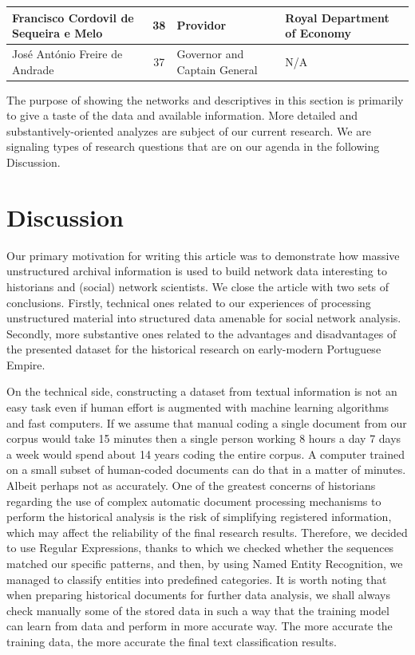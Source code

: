 \documentclass{article}
\begin{document}
\begin{table}[]
\begin{tabular}{|p{4cm}|c|p{4cm}|p{4cm}|}
		Francisco Cordovil de Sequeira e Melo                                        & 38                             & \multicolumn{1}{l|}{Providor}                     & Royal Department of Economy                    \\ \hline
		José António Freire de Andrade                                               & 37                             & \multicolumn{1}{l|}{Governor and Captain General} & N/A                                            \\ \hline
	\end{tabular}
\end{table}

The purpose of showing the networks and descriptives in this section is primarily to give a taste of the data and available information. More detailed and substantively-oriented analyzes are subject of our current research. We are signaling types of research questions that are on our agenda in the following Discussion.

\section{Discussion}

Our primary motivation for writing this article was to demonstrate how massive unstructured archival information is used to build network data interesting to historians and (social) network scientists. We close the article with two sets of conclusions. Firstly, technical ones related to our experiences of processing unstructured material into structured data amenable for social network analysis. Secondly, more substantive ones related to the advantages and disadvantages of the presented dataset for the historical research on early-modern Portuguese Empire.

On the technical side, constructing a dataset from textual information is not an easy task even if human effort is augmented with machine learning algorithms and fast computers. If we assume that manual coding a single document from our corpus would take 15 minutes then a single person working 8 hours a day 7 days a week would spend about 14 years coding the entire corpus. A computer trained on a small subset of human-coded documents can do that in a matter of minutes. Albeit perhaps not as accurately. One of the greatest concerns of historians regarding the use of complex automatic document processing mechanisms to perform the historical analysis is the risk of simplifying registered information, which may affect the reliability of the final research results. Therefore, we decided to use Regular Expressions, thanks to which we checked whether the sequences matched our specific patterns, and then, by using Named Entity Recognition, we managed to classify entities into predefined categories. It is worth noting that when preparing historical documents for further data analysis, we shall always check manually some of the stored data in such a way that the training model can learn from data and perform in more accurate way. The more accurate the training data, the more accurate the final text classification results.
\end{document}
